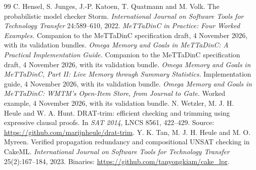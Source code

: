\documentclass[11pt]{article}
\begin{document}
\begin{thebibliography}{99}
 C. Hensel, S. Junges, J.-P. Katoen, T. Quatmann and M. Volk. The probabilistic model checker Storm. \emph{International Journal on Software Tools for Technology Transfer} 24:589--610, 2022.
 \emph{MeTTaDinC in Practice: Four Worked Examples.} Companion to the MeTTaDinC specification draft, 4 November 2026, with its validation bundles.
 \emph{Omega Memory and Goals in MeTTaDinC: A Practical Implementation Guide.} Companion to the MeTTaDinC specification draft, 4 November 2026, with its validation bundle.
 \emph{Omega Memory and Goals in MeTTaDinC, Part II: Live Memory through Summary Statistics.} Implementation guide, 4 November 2026, with its validation bundle.
 \emph{Omega Memory and Goals in MeTTaDinC: WMTM's Open-Item Store, from Journal to Gate.} Worked example, 4 November 2026, with its validation bundle.
 N. Wetzler, M. J. H. Heule and W. A. Hunt. DRAT-trim: efficient checking and trimming using expressive clausal proofs. In \emph{SAT 2014}, LNCS 8561, 422--429. Source: \url{https://github.com/marijnheule/drat-trim}.
 Y. K. Tan, M. J. H. Heule and M. O. Myreen. Verified propagation redundancy and compositional UNSAT checking in CakeML. \emph{International Journal on Software Tools for Technology Transfer} 25(2):167--184, 2023. Binaries: \url{https://github.com/tanyongkiam/cake_lpr}.
\end{thebibliography}
\end{document}

